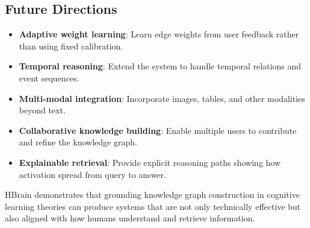 \documentclass[11pt]{article}
\begin{document}
\subsection{Future Directions}

\begin{itemize}
    \item \textbf{Adaptive weight learning}: Learn edge weights from user feedback rather than using fixed calibration.
    \item \textbf{Temporal reasoning}: Extend the system to handle temporal relations and event sequences.
    \item \textbf{Multi-modal integration}: Incorporate images, tables, and other modalities beyond text.
    \item \textbf{Collaborative knowledge building}: Enable multiple users to contribute and refine the knowledge graph.
    \item \textbf{Explainable retrieval}: Provide explicit reasoning paths showing how activation spread from query to answer.
\end{itemize}

HBrain demonstrates that grounding knowledge graph construction in cognitive learning theories can produce systems that are not only technically effective but also aligned with how humans understand and retrieve information.
\end{document}
